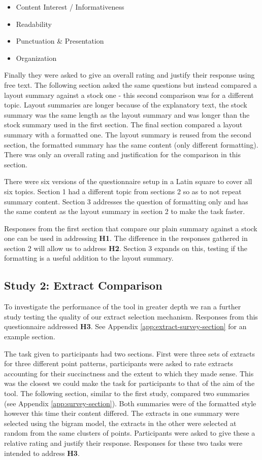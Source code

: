       \begin{itemize}
        \item{Content Interest / Informativeness}
        \item{Readability}
        \item{Punctuation \& Presentation}
        \item{Organization}
      \end{itemize}

      Finally they were asked to give an overall rating and justify their response using free text. The following section asked the same questions but instead compared a layout summary against a stock one - this second comparison was for a different topic. Layout summaries are longer because of the explanatory text, the stock summary was the same length as the layout summary and was longer than the stock summary used in the first section. The final section compared a layout summary with a formatted one. The layout summary is reused from the second section, the formatted summary has the same content (only different formatting). There was only an overall rating and justification for the comparison in this section.

      There were six versions of the questionnaire setup in a Latin square to cover all six topics. Section 1 had a different topic from sections 2 so as to not repeat summary content. Section 3 addresses the question of formatting only and has the same content as the layout summary in section 2 to make the task faster.

      Responses from the first section that compare our plain summary against a stock one can be used in addressing \textbf{H1}. The difference in the responses gathered in section 2 will allow us to address \textbf{H2}. Section 3 expands on this, testing if the formatting is a useful addition to the layout summary.

    \tocless\subsection{Study 2: Extract Comparison}
    To investigate the performance of the tool in greater depth we ran a further study testing the quality of our extract selection mechanism. Responses from this questionnaire addressed \textbf{H3}. See Appendix \ref{app:extract-survey-section} for an example section.

    The task given to participants had two sections. First were three sets of extracts for three different point patterns, participants were asked to rate extracts accounting for their succinctness and the extent to which they made sense. This was the closest we could make the task for participants to that of the aim of the tool. The following section, similar to the first study, compared two summaries (see Appendix \ref{app:survey-section}). Both summaries were of the formatted style however this time their content differed. The extracts in one summary were selected using the bigram model, the extracts in the other were selected at random from the same clusters of points. Participants were asked to give these a relative rating and justify their response. Responses for these two tasks were intended to address \textbf{H3}.

